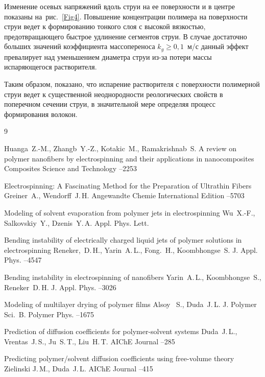 Изменение осевых напряжений вдоль струи на ее поверхности и в центре показаны на~рис.~\ref{Fig4}. Повышение концентрации полимера на поверхности струи ведет к формированию тонкого слоя с высокой вязкостью, предотвращающего быстрое удлинение сегментов струи. В случае достаточно больших значений коэффициента массопереноса \mbox{$k_g  \ge 0,1$}~м/с данный эффект превалирует над уменьшением диаметра струи из-за потери массы испаряющегося растворителя.


Таким образом, показано, что испарение растворителя с поверхности полимерной струи ведет к существенной неоднородности реологических свойств в поперечном сечении струи, в значительной мере определяя процесс формирования волокон.

\newpage

\begin{thebibliography}{9}


\by  Huanga~Z.-M., Zhangb~Y.-Z., Kotakic~M.,  Ramakrishnab~S.
\paper A review on polymer nanofibers by electrospinning and their applications in nanocomposites
\jour Composites Science and Technology
--2253

\paper Electrospinning: A Fascinating Method for the Preparation of Ultrathin Fibers
\by Greiner~A., Wendorff~J.\,H.
\jour Angewandte Chemie International Edition
--5703

\paper Modeling of solvent evaporation from polymer jets in electrospinning
\by Wu~X.-F., Salkovskiy~Y., Dzenis~Y.\,A.
\jour Appl. Phys. Lett.

\paper Bending instability of electrically charged liquid jets of polymer solutions in electrospinning
\by Reneker,~D.\,H., Yarin~A.\,L., Fong.~H.,  Koombhongse~S.
\jour J. Appl. Phys. 
--4547


\paper Bending instability in electrospinning of nanofibers
\by Yarin~A.\,L., Koombhongse~S., Reneker~D.\,H. 
\jour J. Appl. Phys. 
--3026

\paper Modeling of multilayer drying of polymer films
\by Alsoy~ S., Duda~J.\,L.
\jour J. Polymer Sci.~B. Polymer Phys.
--1675

\paper Prediction of diffusion coefficients for polymer-solvent systems
\by Duda~J.\,L.,   Vrentas~J.\,S., Ju~S.\,T., Liu~H.\,T. 
\jour AIChE Journal
--285

\paper Predicting polymer/solvent diffusion coefficients using free-volume theory
\by Zielinski J.\,M., Duda~J.\,L.
\jour AIChE Journal
--415

\end{thebibliography}

\noindent
\hskip6.5cm \thedate \par\noindent
\hskip6.5cm\therevdate

\makeengtitle

\newpage

%
